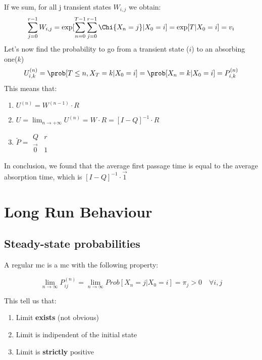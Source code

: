 If we sum, for all j transient states $W_{i,j}$  we obtain:
\begin{equation}
	\sum\limits_{j=0}^{r-1}W_{i,j} = \exp[\sum\limits_{n=0}^{T-1}\sum\limits_{j=0}^{r-1}\Chi\{X_n=j\}|X_0=i] = \exp[T|X_0=i]=v_i
\end{equation}
Let's now find the probability to go from a transient state ($i$) to an absorbing one($k$)
\begin{equation}
	U_{i,k}^{(n)} = \prob[T \le n , X_T = k | X_0=i] = \prob[X_n=k|X_0=i]=P_{i,k}^{(n)}
\end{equation}
This means that:
\begin{enumerate}
	\item $U^{(n)} = W^{(n-1)}\cdot R$
	\item $U=\lim_{n\to +\infty} U^{(n)} = W \cdot R = [I-Q]^{-1}\cdot R$
	\item $\tilde{P}=\begin{matrix} Q & r \\ \vec{0}&1 \end{matrix}$
\end{enumerate}
In conclusion, we found that the average first passage time is equal to the average
 absorption time, which is $[I-Q]^{-1}\cdot \vec{1}$

\chapter{Long Run Behaviour}
\section{Steady-state probabilities}

	\begin{definition}
		A regular \gls{mc} is a \gls{mc} with the following property:

		\begin{equation} \lim_{n \to \infty} P_{ij}^{(n)} = \lim_{ n \to \infty} Prob[ X_n=j | X_0 =i] = \pi_j > 0 \quad \forall i, j \end{equation}

	\end{definition}

	This tell us that:
	\begin{enumerate}
		\item Limit \textbf{exists} (not obvious)
		\item Limit is indipendent of the initial state
		\item Limit is \textbf{strictly} positive
	\end{enumerate}

